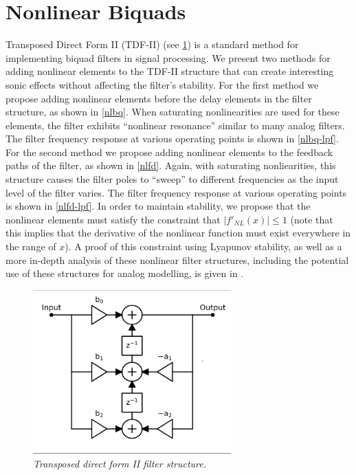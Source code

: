 \documentclass[twoside,a4paper]{article}
\begin{document}
\section{Nonlinear Biquads} \label{sec:nlbq}
%
Transposed Direct Form II (TDF-II) (see \cref{tdf2}) is a standard method for
implementing biquad filters in signal processing. We present two
methods for adding nonlinear elements to the TDF-II structure that
can create interesting sonic effects without affecting the filter's
stability.
\newline\newline
For the first method we propose adding nonlinear elements before the delay
elements in the filter structure, as shown in \cref{nlbq}. When saturating
nonlinearities are used for these elements, the filter exhibits ``nonlinear
resonance'' similar to many analog filters. The filter frequency response at
various operating points is shown in \cref{nlbq-lpf}.
\newline\newline
For the second method we propose adding nonlinear elements to the feedback
paths of the filter, as shown in \cref{nlfd}. Again, with saturating
nonliearities, this structure causes the filter poles to ``sweep'' to
different frequencies as the input level of the filter varies. The filter
frequency response at various operating points is shown in \cref{nlfd-lpf}.
\newline\newline
In order to maintain stability, we propose that the nonlinear elements must
satisfy the constraint that $|f'_{NL}(x)| \leq 1$ (note that this implies that
the derivative of the nonlinear function must exist everywhere in the range
of $x$). A proof of this constraint using Lyapunov stability, as well as a
more in-depth analysis of these nonlinear filter structures, including the
potential use of these structures for analog modelling, is given in
\cite{NLBiquad}.
%
\begin{figure}[h]
    \center
    \includegraphics[width=3in]{../NonlinearBiquad/Pics/TDF-II-White.png}
    \caption{\label{tdf2}{\it Transposed direct form II filter structure.}}
\end{figure}
\end{document}
